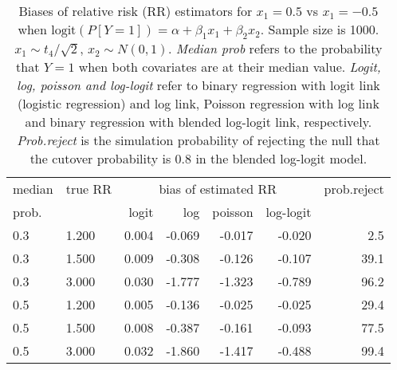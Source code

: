\documentclass[12pt,a4paper]{article}
\begin{document}
\begin{table}[H] 
\small\sf\centering 
\caption{Biases of relative risk (RR) estimators for $x_1=0.5$ vs $x_1=-0.5$ when $\mbox{logit}(P[Y=1])=\alpha+\beta_1 x_1 + \beta_2 x_2$. Sample size is 1000. $x_1 \sim $$t_4/\sqrt{2}$, $x_2 \sim N(0,1)$. {\it Median prob} refers to the probability that $Y=1$ when both covariates are at their median value. {\it Logit, log, poisson and log-logit} refer to binary regression with logit link (logistic regression) and log link, Poisson regression with log link and binary regression with blended log-logit link, respectively. {\it Prob.reject} is the simulation probability of rejecting the null that the cutover probability is $0.8$ in the blended log-logit model.} 
\begin{tabular}{llrrrrr} 
\toprule 
median & true RR & \multicolumn{4}{c}{bias of estimated RR} & prob.reject \\ 
prob. & & logit & log & poisson & log-logit  & \\ \midrule 
0.3 & 1.200 & 0.004 & -0.069 & -0.017 & -0.020 &  2.5 \\  
0.3 & 1.500 & 0.009 & -0.308 & -0.126 & -0.107 & 39.1 \\  
0.3 & 3.000 & 0.030 & -1.777 & -1.323 & -0.789 & 96.2 \\  
0.5 & 1.200 & 0.005 & -0.136 & -0.025 & -0.025 & 29.4 \\  
0.5 & 1.500 & 0.008 & -0.387 & -0.161 & -0.093 & 77.5 \\  
0.5 & 3.000 & 0.032 & -1.860 & -1.417 & -0.488 & 99.4 \\  
\bottomrule 
\end{tabular} 
\end{table} 
\end{document}
